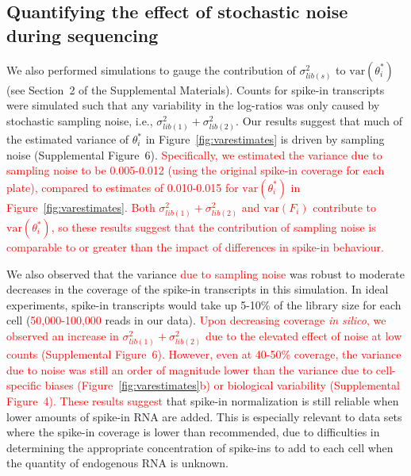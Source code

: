 \documentclass{article}
\newcommand{\suppfigcell}{4}
\newcommand{\suppfignoise}{6}
\newcommand{\suppsecnoise}{2}
\newcommand{\revised}[1]{\textcolor{red}{#1}}
\newcommand\variance{\mbox{var}}
\begin{document}
\subsection*{Quantifying the effect of stochastic noise during sequencing}
We also performed simulations to gauge the contribution of $\sigma^2_{lib(s)}$ to $\variance(\theta^*_i)$ (see Section~\suppsecnoise{} of the Supplemental Materials).
Counts for spike-in transcripts were simulated such that any variability in the log-ratios was only caused by stochastic sampling noise, i.e., $\sigma^2_{lib(1)} + \sigma^2_{lib(2)}$.
Our results suggest that much of the estimated variance of $\theta^*_i$ in Figure~\ref{fig:varestimates} is driven by sampling noise (Supplemental Figure~\suppfignoise{}).
\revised{Specifically, we estimated the variance due to sampling noise to be 0.005-0.012 (using the original spike-in coverage for each plate), compared to estimates of 0.010-0.015 for $\variance(\theta^*_i)$ in Figure~\ref{fig:varestimates}.
Both $\sigma^2_{lib(1)} + \sigma^2_{lib(2)}$ and  $\variance(F_i)$ contribute to  $\variance(\theta^*_i)$, so these results suggest that the contribution of sampling noise is comparable to or greater than the impact of differences in spike-in behaviour.}

We also observed that the variance \revised{due to sampling noise} was robust to moderate decreases in the coverage of the spike-in transcripts in this simulation.
In ideal experiments, spike-in transcripts would take up 5-10\% of the library size for each cell (\revised{50,000-100,000} reads in our data).
\revised{Upon decreasing coverage \textit{in silico}, we observed an increase in $\sigma^2_{lib(1)} + \sigma^2_{lib(2)}$ due to the elevated effect of noise at low counts (Supplemental Figure~\suppfignoise{}).
However, even at 40-50\% coverage, the variance due to noise was still an order of magnitude lower than the variance due to cell-specific biases (Figure~\ref{fig:varestimates}b) or biological variability (Supplemental Figure~\suppfigcell{}).
These results suggest} that spike-in normalization is still reliable when lower amounts of spike-in RNA are added.
This is especially relevant to data sets where the spike-in coverage is lower than recommended, due to difficulties in determining the appropriate concentration of spike-ins to add to each cell when the quantity of endogenous RNA is unknown.
\end{document}
